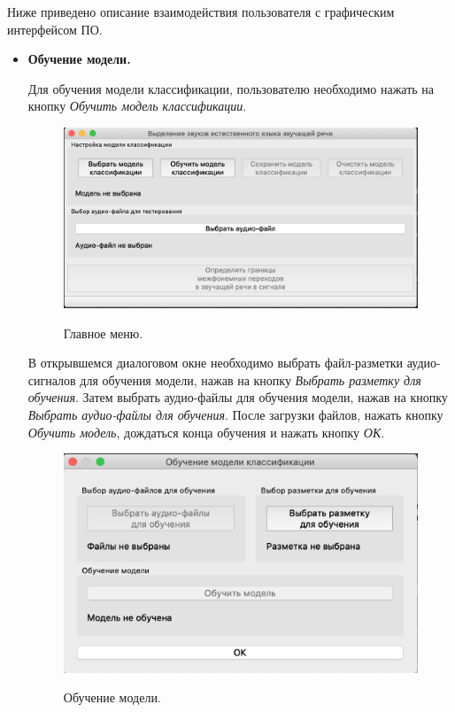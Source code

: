\documentclass[utf8x, 14pt, oneside, a4paper]{article}
\begin{document}
	Ниже приведено описание взаимодействия пользователя с графическим интерфейсом ПО.
	\begin{itemize}
		\item {\bf Обучение модели.}
		
		Для обучения модели классификации, пользователю необходимо нажать на кнопку \textit{Обучить модель классификации}. 
		
		\begin{figure}[h!]
			\begin{center}
				{\includegraphics[scale = 0.65]{img/start.png}}
			\end{center}
			\caption{Главное меню.}
			\label{ris:start}
		\end{figure}
		
		В открывшемся диалоговом окне необходимо выбрать файл-разметки аудио-сигналов для обучения модели, нажав на кнопку \textit{Выбрать разметку для обучения}. Затем выбрать аудио-файлы для обучения модели, нажав на кнопку \textit{Выбрать аудио-файлы для обучения}. После загрузки файлов, нажать \linebreak кнопку \textit{Обучить модель}, дождаться конца обучения и нажать кнопку \textit{ОК}.
		
		\newpage
		
		\begin{figure}[h!]
			\begin{center}
				{\includegraphics[scale = 0.8]{img/teach.png}}
			\end{center}
			\caption{Обучение модели.}
			\label{ris:teach}
		\end{figure}
		

\end{itemize}
\end{document}
